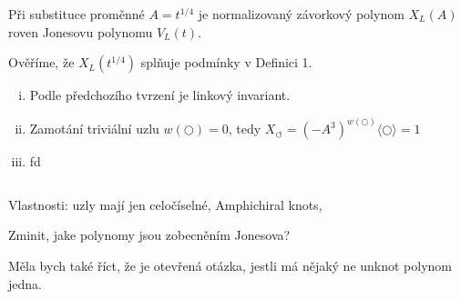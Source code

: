 \begin{veta}
Při substituce proměnné $A = t^{1/4}$ je normalizovaný závorkový polynom $X_L(A)$  roven Jonesovu polynomu $V_L(t)$.
\end{veta}
\begin{dukaz}
Ověříme, že $X_L(t^{1/4})$ splňuje podmínky v Definici 1.

\begin{enumerate}[i.]
\item
Podle předchozího tvrzení je linkový invariant.
\item
Zamotání triviální uzlu $w( \bigcirc) = 0$, tedy $X_\circlearrowleft = (-A^3)^{w( \bigcirc)} \langle \bigcirc  \rangle = 1$ 
\item
fd
\end{enumerate}
$ $
\end{dukaz}



Vlastnosti:
uzly mají jen celočíselné, Amphichiral knots, 

Zminit, jake polynomy jsou zobecněním Jonesova?

Měla bych také říct, že je otevřená otázka, jestli má nějaký ne unknot polynom jedna.